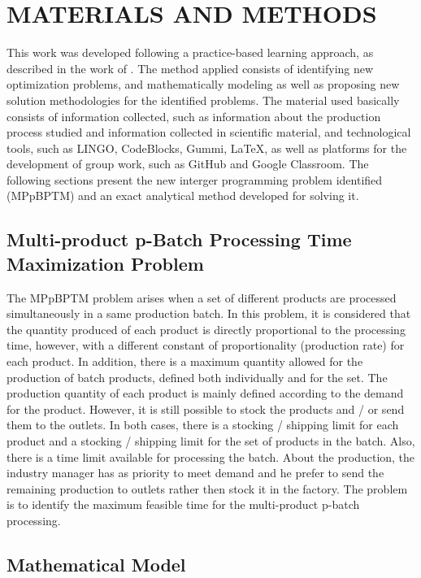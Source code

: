 \documentclass[10pt,fleqn,a4paper,twoside]{article}
\begin{document}
\section{MATERIALS AND METHODS}

This work was developed following a practice-based learning approach, as described in the work of \cite{Fraga2022}. The method applied consists of identifying new optimization problems, and mathematically modeling as well as proposing new solution methodologies for the identified problems. The material used basically consists of information collected, such as information about the production process studied and information collected in scientific material, and technological tools, such as LINGO, CodeBlocks, Gummi, LaTeX, as well as platforms for the development of group work, such as GitHub and Google Classroom. The following sections present the new interger programming problem identified (MPpBPTM) and an exact analytical method developed for solving it.

\subsection{Multi-product p-Batch Processing Time Maximization Problem}
\label{sec:MBPTMP}

The MPpBPTM problem arises when a set of different products are processed simultaneously in a same production batch. In this problem, it is considered that the quantity produced of each product is directly proportional to the processing time, however, with a different constant of proportionality (production rate) for each product. In addition, there is a maximum quantity allowed for the production of batch products, defined both individually and for the set. The production quantity of each product is mainly defined according to the demand for the product. However, it is still possible to stock the products and / or send them to the outlets. In both cases, there is a stocking / shipping limit for each product and a stocking / shipping limit for the set of products in the batch. Also, there is a time limit available for processing the batch. About the production, the industry manager has as priority to meet demand and he prefer to send the remaining production to outlets rather then stock it in the factory. The problem is to identify the maximum feasible time for the multi-product p-batch processing. 

\subsection{Mathematical Model}
\label{sec:mathModel}
\end{document}

